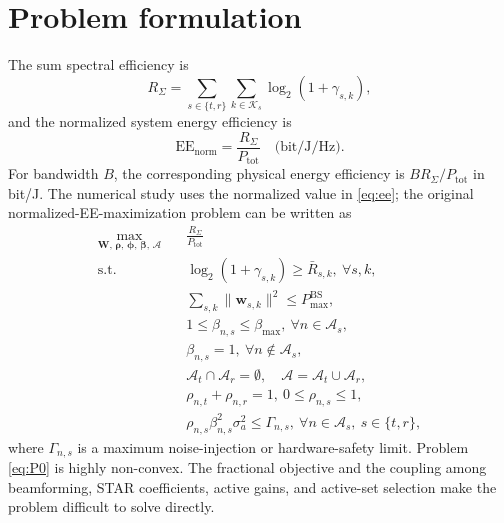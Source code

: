 \documentclass[journal]{IEEEtran}
\begin{document}
\section{Problem formulation}
\vspace{-1.5mm}
The sum spectral efficiency is
\begin{equation}
R_\Sigma = \sum_{s\in\{t,r\}}\sum_{k\in\mathcal{K}_s}\log_2(1+\gamma_{s,k}),
\label{eq:sumrate}
\end{equation}
and the normalized system energy efficiency is
\begin{equation}
\mathrm{EE}_{\mathrm{norm}} = \frac{R_\Sigma}{P_{\mathrm{tot}}}\quad \text{(bit/J/Hz)}.
\label{eq:ee}
\end{equation}
For bandwidth $B$, the corresponding physical energy efficiency is $BR_\Sigma/P_{\mathrm{tot}}$ in bit/J. The numerical study uses the normalized value in \eqref{eq:ee}; the original normalized-EE-maximization problem can be written as
\begin{equation}
\begin{aligned}
\max_{\mathbf{W},\,\bm{\rho},\,\bm{\phi},\,\bm{\beta},\,\mathcal{A}}
\quad & \frac{R_\Sigma}{P_{\mathrm{tot}}} \\
\text{s.t.}\quad &
\log_2(1+\gamma_{s,k})\ge \bar{R}_{s,k},\ \forall s,k, \\
&
\sum_{s,k}\|\mathbf{w}_{s,k}\|^2 \le P_{\max}^{\mathrm{BS}},\\
&
1\le \beta_{n,s}\le \beta_{\max},\ \forall n\in\mathcal{A}_s,\\
&
\beta_{n,s}=1,\ \forall n\notin\mathcal{A}_s,\\
&
\mathcal{A}_t\cap\mathcal{A}_r=\emptyset,\quad \mathcal{A}=\mathcal{A}_t\cup\mathcal{A}_r,\\
&
\rho_{n,t}+\rho_{n,r}=1,\ 0\le \rho_{n,s}\le 1,\\
&
\rho_{n,s}\beta_{n,s}^2\sigma_a^2 \le \Gamma_{n,s},\ \forall n\in\mathcal{A}_s,\ s\in\{t,r\},
\end{aligned}
\label{eq:P0}
\end{equation}
where $\Gamma_{n,s}$ is a maximum noise-injection or hardware-safety limit. Problem \eqref{eq:P0} is highly non-convex. The fractional objective and the coupling among beamforming, STAR coefficients, active gains, and active-set selection make the problem difficult to solve directly.
\end{document}
